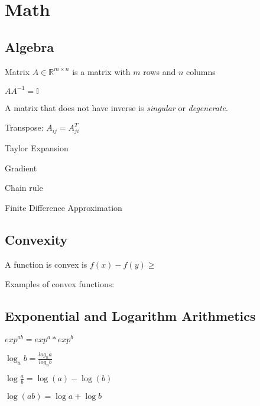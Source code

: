 \chapter{Math}
\section{Algebra}

Matrix $A \in\mathbb R^{m\times n}$ is a matrix with $m$ rows and $n$ columns

$AA^{-1}=\mathbb{I}$

A matrix that does not have inverse is \emph{singular} or \emph{degenerate}.

Transpose: $A_{ij} = A_{ji}^T$

Taylor Expansion

Gradient

Chain rule

Finite Difference Approximation

\section{Convexity}

A function is convex is $f(x) - f(y) \ge $

Examples of convex functions: 

\section{Exponential and Logarithm Arithmetics}

$exp^{ab} = exp^a*exp^b$

$\log_ab = \frac{log_n a}{log_n b}$

$\log\frac{a}{b} = \log(a) -\log(b)$

$\log(ab) = \log a + \log b$
